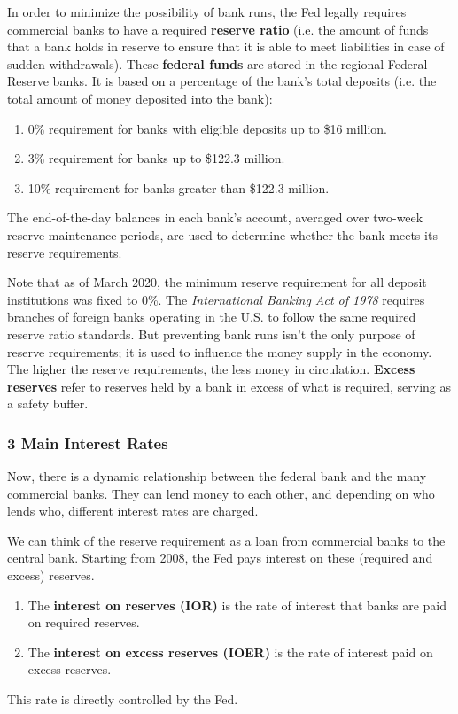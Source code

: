 \documentclass{article}
\begin{document}
      In order to minimize the possibility of bank runs, the Fed legally requires commercial banks to have a required \textbf{reserve ratio} (i.e. the amount of funds that a bank holds in reserve to ensure that it is able to meet liabilities in case of sudden withdrawals). These \textbf{federal funds} are stored in the regional Federal Reserve banks. It is based on a percentage of the bank's total deposits (i.e. the total amount of money deposited into the bank): 
      \begin{enumerate}
        \item 0\% requirement for banks with eligible deposits up to \$16 million. 
        \item 3\% requirement for banks up to \$122.3 million. 
        \item 10\% requirement for banks greater than \$122.3 million. 
      \end{enumerate}
      The end-of-the-day balances in each bank's account, averaged over two-week reserve maintenance periods, are used to determine whether the bank meets its reserve requirements. 

      Note that as of March 2020, the minimum reserve requirement for all deposit institutions was fixed to 0\%. The \textit{International Banking Act of 1978} requires branches of foreign banks operating in the U.S. to follow the same required reserve ratio standards. But preventing bank runs isn't the only purpose of reserve requirements; it is used to influence the money supply in the economy. The higher the reserve requirements, the less money in circulation. \textbf{Excess reserves} refer to reserves held by a bank in excess of what is required, serving as a safety buffer. 

    \subsubsection{3 Main Interest Rates}

      Now, there is a dynamic relationship between the federal bank and the many commercial banks. They can lend money to each other, and depending on who lends who, different interest rates are charged. 

      \begin{definition}
        We can think of the reserve requirement as a loan from commercial banks to the central bank. Starting from 2008, the Fed pays interest on these (required and excess) reserves. 
        \begin{enumerate}
            \item The \textbf{interest on reserves (IOR)} is the rate of interest that banks are paid on required reserves. 
            \item The \textbf{interest on excess reserves (IOER)} is the rate of interest paid on excess reserves.
        \end{enumerate}
        This rate is directly controlled by the Fed. 
      \end{definition}
\end{document}
